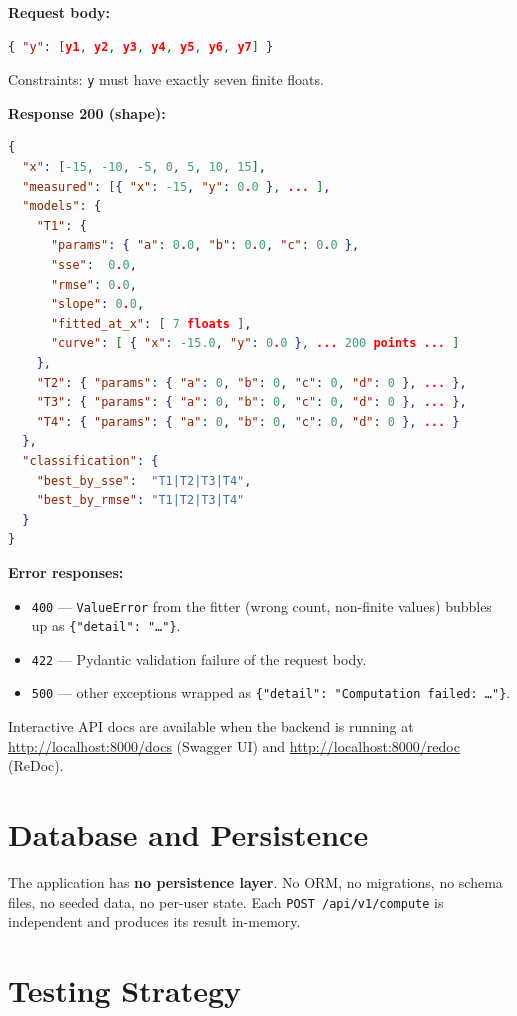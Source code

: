 \documentclass[11pt,a4paper]{article}
\begin{document}
\textbf{Request body:}
\begin{lstlisting}[language=json]
{ "y": [y1, y2, y3, y4, y5, y6, y7] }
\end{lstlisting}
Constraints: \texttt{y} must have exactly seven finite floats.

\textbf{Response 200 (shape):}
\begin{lstlisting}[language=json]
{
  "x": [-15, -10, -5, 0, 5, 10, 15],
  "measured": [{ "x": -15, "y": 0.0 }, ... ],
  "models": {
    "T1": {
      "params": { "a": 0.0, "b": 0.0, "c": 0.0 },
      "sse":  0.0,
      "rmse": 0.0,
      "slope": 0.0,
      "fitted_at_x": [ 7 floats ],
      "curve": [ { "x": -15.0, "y": 0.0 }, ... 200 points ... ]
    },
    "T2": { "params": { "a": 0, "b": 0, "c": 0, "d": 0 }, ... },
    "T3": { "params": { "a": 0, "b": 0, "c": 0, "d": 0 }, ... },
    "T4": { "params": { "a": 0, "b": 0, "c": 0, "d": 0 }, ... }
  },
  "classification": {
    "best_by_sse":  "T1|T2|T3|T4",
    "best_by_rmse": "T1|T2|T3|T4"
  }
}
\end{lstlisting}

\textbf{Error responses:}
\begin{itemize}[leftmargin=1.2em]
  \item \texttt{400} --- \texttt{ValueError} from the fitter (wrong count,
        non-finite values) bubbles up as \texttt{\{"detail": "\ldots"\}}.
  \item \texttt{422} --- Pydantic validation failure of the request body.
  \item \texttt{500} --- other exceptions wrapped as
        \texttt{\{"detail": "Computation failed: \ldots"\}}.
\end{itemize}

Interactive API docs are available when the backend is running at
\url{http://localhost:8000/docs} (Swagger UI) and
\url{http://localhost:8000/redoc} (ReDoc).

\section{Database and Persistence}
\label{sec:db}

The application has \textbf{no persistence layer}. No ORM, no migrations,
no schema files, no seeded data, no per-user state. Each
\texttt{POST /api/v1/compute} is independent and produces its result
in-memory.

\section{Testing Strategy}
\label{sec:testing}
\end{document}
